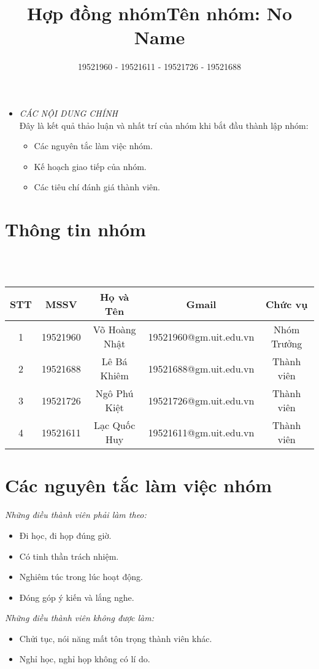 \documentclass[12pt, a4paper]{article}
\title{Hợp đồng nhóm}
\author{19521960 - 19521611 - 19521726 - 19521688 }
\begin{document}
\maketitle
\color{blue}
 \large\begin{itemize}
    \item\textit{CÁC NỘI DUNG CHÍNH}\\
      \small \color{black}
Đây là kết quả thảo luận và nhất trí của nhóm khi bắt đầu thành lập nhóm:
    \begin{itemize}
    \item Các nguyên tắc làm việc nhóm.
    \item Kế hoạch giao tiếp của nhóm.
    \item Các tiêu chí đánh giá thành viên.
    \end{itemize}
 \end{itemize}
\color{black}

\section{Thông tin nhóm}
  \small\title{Tên nhóm: No Name}\\ \\
    \begin{tabular}{|c|c|c|c|c|}
      \hline
        STT & MSSV & Họ và Tên & Gmail & Chức vụ \\
      \hline
         1 & 19521960 & Võ Hoàng Nhật & 19521960@gm.uit.edu.vn & Nhóm Trưởng\\
      \hline
         2 & 19521688 & Lê Bá Khiêm & 19521688@gm.uit.edu.vn & Thành viên\\
      \hline
         3 & 19521726 & Ngô Phú Kiệt & 19521726@gm.uit.edu.vn & Thành viên\\
      \hline
         4 & 19521611 & Lạc Quốc Huy & 19521611@gm.uit.edu.vn & Thành viên \\
         \hline
    \end{tabular}
\section{Các nguyên tắc làm việc nhóm}
   \textit{Những điều thành viên phải làm theo:}
   \begin{itemize}
         \item Đi học, đi họp đúng giờ.
         \item Có tinh thần trách nhiệm.
         \item Nghiêm túc trong lúc hoạt động.
         \item Đóng góp ý kiến và lắng nghe.
 \end{itemize} 
     \textit{Những điều thành viên không được làm:}
   \begin{itemize}
      \item Chửi tục, nói năng mất tôn trọng thành viên khác.
      \item Nghỉ học, nghỉ họp không có lí do.
 \end{itemize}     
\end{document}
